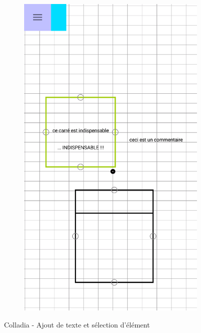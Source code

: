 \begin{figure}[!h]
\begin{subfigure}[t]{.27\textwidth}
			\end{subfigure}
			~
			\begin{subfigure}[t]{.27\textwidth}
				\includegraphics[width=\textwidth]{img/screen/colladia_draw_view_element_text}
			\end{subfigure}
			\caption{Colladia - Ajout de texte et sélection d'élément}
		\end{figure}
		\vspace*{\fill}
		
